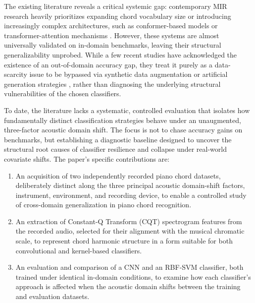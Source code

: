 \documentclass[pdflatex,sn-mathphys-num,iicol]{sn-jnl}
\theoremstyle{thmstyleone}
\theoremstyle{thmstyletwo}
\theoremstyle{thmstylethree}
\begin{document}
The existing literature reveals a critical systemic gap: contemporary MIR research heavily prioritizes expanding chord vocabulary size \cite{Majchrzak2025} or introducing increasingly complex architectures, such as conformer-based models \cite{Akram2025} or transformer-attention mechanisms \cite{Kusaka2024}. However, these systems are almost universally validated on in-domain benchmarks, leaving their structural generalizability unprobed. While a few recent studies have acknowledged the existence of an out-of-domain accuracy gap, they treat it purely as a data-scarcity issue to be bypassed via synthetic data augmentation \cite{Kusaka2024} \cite{Byambatsogt2020} or artificial generation strategies \cite{Majchrzak2025} \cite{Ostermann2023}, rather than diagnosing the underlying structural vulnerabilities of the chosen classifiers.

To date, the literature lacks a systematic, controlled evaluation that isolates how fundamentally distinct classification strategies behave under an unaugmented, three-factor acoustic domain shift. The focus is not to chase accuracy gains on benchmarks, but establishing a diagnostic baseline designed to uncover the structural root causes of classifier resilience and collapse under real-world covariate shifts. The paper's specific contributions are:

\begin{enumerate}[1.]

\item An acquisition of two independently recorded piano chord datasets, deliberately distinct along the three principal acoustic domain-shift factors, instrument, environment, and recording device, to enable a controlled study of cross-domain generalization in piano chord recognition.

\item An extraction of Constant-Q Transform (CQT) spectrogram features from the recorded audio, selected for their alignment with the musical chromatic scale, to represent chord harmonic structure in a form suitable for both convolutional and kernel-based classifiers.

\item An evaluation and comparison of a CNN and an RBF-SVM classifier, both trained under identical in-domain conditions, to examine how each classifier's approach is affected when the acoustic domain shifts between the training and evaluation datasets.

\end{enumerate}
\end{document}
